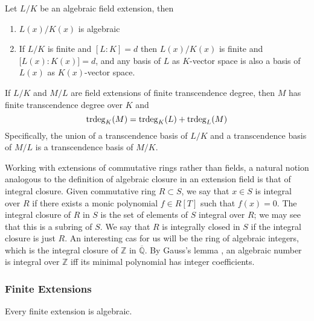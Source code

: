 \begin{lemma}
   Let \(L/K\) be an algebraic field extension, then
   \begin{enumerate}[label=\roman*, align=Center]
      \item \(L(x)/K(x)\) is algebraic
      \item If \(L/K\) is finite and \([L:K] = d\) then \(L(x)/K(x)\) is finite and \(\big[L(x):K(x)\big] = d\), and any basis of \(L\) as \(K\)-vector space is also a basis of \(L(x)\) as \(K(x)\)-vector space.
   \end{enumerate}
\end{lemma}

\begin{proposition}
   If \(L/K\) and \(M/L\) are field extensions of finite transcendence degree, then \(M\) has finite transcendence degree over \(K\) and
   \[\operatorname{trdeg}_K(M) = \operatorname{trdeg}_K(L) + \operatorname{trdeg}_L(M)\]
   Specifically, the union of a transcendence basis of \(L/K\) and a transcendence basis of \(M/L\) is a transcendence basis of \(M/K\).
\end{proposition}

\begin{remark}
   Working with extensions of commutative rings rather than fields, a natural notion analogous to the definition of algebraic closure in an extension field is that of integral closure.
   Given commutative ring \(R \subset S\), we say that \(x \in S\) is integral over \(R\) if there exists a monic polynomial \(f \in R[T]\) such that \(f(x) = 0\).
   The integral closure of \(R\) in \(S\) is the set of elements of \(S\) integral over \(R\); we may see that this is a subring of \(S\).
   We say that \(R\) is integrally closed in \(S\) if the integral closure is just \(R\).
   An interesting cas for us will be the ring of algebraic integers, which is the integral closure of \(\mathbb{Z}\) in \(\overline{\mathbb{Q}}\).
   By Gauss's lemma , an algebraic number is integral over \(\mathbb{Z}\) iff its minimal polynomial has integer coefficients.
\end{remark}

\subsubsection{Finite Extensions}
   Every finite extension is algebraic.

